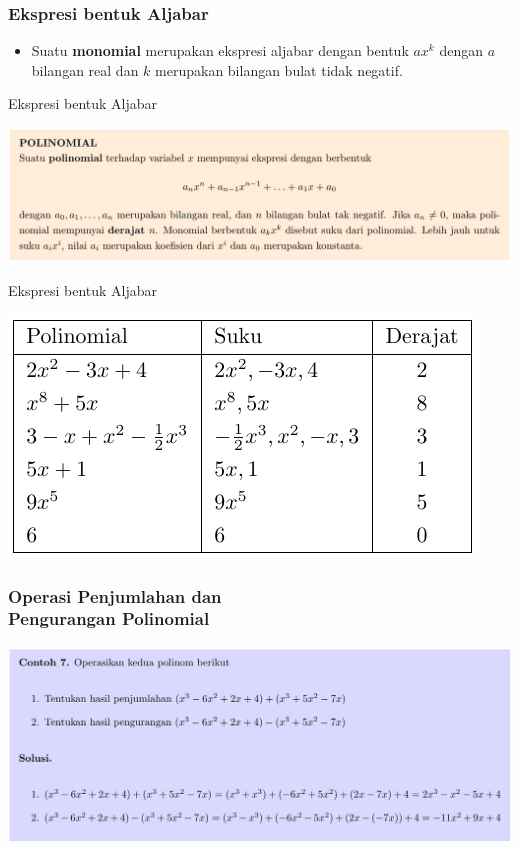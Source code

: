 \documentclass[pdflatex,compress,mathserif]{beamer}
\begin{document}
\begin{frame}
	\frametitle{Ekspresi bentuk Aljabar}
	\begin{itemize}
		\item Suatu \textbf{monomial} merupakan ekspresi aljabar dengan bentuk $ax^k$ dengan $a$ bilangan real dan $k$ merupakan bilangan bulat tidak negatif.
	\end{itemize}
\end{frame}

\begin{frame}{Ekspresi bentuk Aljabar}
	\begin{center}
		\includegraphics[width=\linewidth]{img/img19}
	\end{center}
\end{frame}

\begin{frame}{Ekspresi bentuk Aljabar}
	\begin{center}
		\includegraphics[width=0.7\linewidth]{img/img20}
	\end{center}
\end{frame}

\begin{frame}
	\frametitle{Operasi Penjumlahan dan\\Pengurangan Polinomial}
	\begin{center}
		\includegraphics[width=\linewidth]{img/img21}
	\end{center}
\end{frame}
\end{document}
